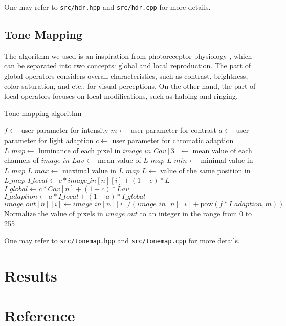 \documentclass[11pt]{article}
\begin{document}
One may refer to \texttt{src/hdr.hpp} and \texttt{src/hdr.cpp} for more details.

\newpage
\subsection{Tone Mapping}
The algorithm we used is an inspiration from photoreceptor physiology \cite{ref:tone-map}, which can be separated into two concepts: global and local reproduction. The part of global operators considers overall characteristics, such as contrast, brightness, color saturation, and etc., for visual perceptions. On the other hand, the part of local operators focuses on local modifications, such as haloing and ringing.

\begin{algorithm}
\caption{Tone mapping algorithm \cite{ref:tone-map}}\label{euclid}
\begin{algorithmic}[1]
\State $f\gets$ user parameter for intensity
\State $m\gets$ user parameter for contrast
\State $a\gets$ user parameter for light adaption 
\State $c\gets$ user parameter for chromatic adaption
\State $L\_map\gets$ luminance of each pixel in $image\_in$
\State $Cav[3]\gets$ mean value of each channels of $image\_in$
\State $Lav\gets$ mean value of $L\_map$
\State $L\_min\gets$ minimal value in $L\_map$
\State $L\_max\gets$ maximal value in $L\_map$
\State $L\gets$ value of the same position in $L\_map$
\State $I\_local\gets c* image\_in[n][i]+ (1-c)*L$
\State $I\_global\gets c*Cav[n]+ (1-c)* Lav$
\State $I\_adaption\gets a*I\_local+(1-a)*I\_global$
\State $image\_out[n][i]\gets image\_in[n][i]/(image\_in[n][i]+\mbox{pow}(f*I\_adaption, m))$
\EndFor
\EndFor
\State Normalize the value of pixels in $image\_out$ to an integer in the range from 0 to 255
\EndFunction
\end{algorithmic}
\end{algorithm}

One may refer to \texttt{src/tonemap.hpp} and \texttt{src/tonemap.cpp} for more details.

\section{Results}

\begin{figure}[!ht]
	\centering
	\label{distort}
\end{figure}

\section{Reference}


\end{document}
